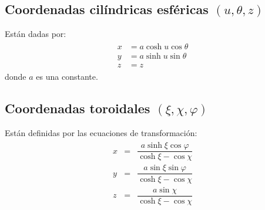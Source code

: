 \subsection*{Coordenadas cilíndricas esféricas $(u, \theta, z)$}
Están dadas por:
\begin{eqnarray}
\begin{aligned}
x &= a \cosh u \cos \theta \\
y &= a \sinh u \sin \theta \\
z &= z
\end{aligned}
\end{eqnarray}
donde $a$ es una constante.
\subsection*{Coordenadas toroidales $(\xi,\chi,\varphi)$}
Están definidas por las ecuaciones de transformación:
\begin{eqnarray}
\begin{aligned}
x &=& \dfrac{a \sinh \xi \cos \varphi}{\cosh \xi - \cos \chi} \\
y &=& \dfrac{a \sin  \xi \sin \varphi}{\cosh \xi - \cos \chi} \\
z &=& \dfrac{a \sin \chi}{\cosh \xi - \cos \chi}
\end{aligned}
\end{eqnarray}

